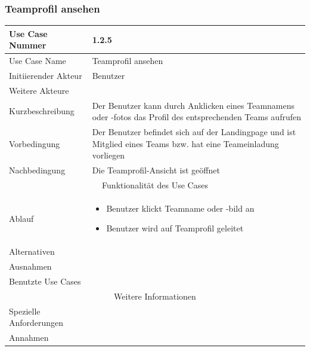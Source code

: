 \documentclass[10pt,a4paper]{article}
\begin{document}
		\subsubsection{Teamprofil ansehen}
		\begin{tabular}{|l|p{.5\linewidth}|}
			\hline Use Case Nummer & 1.2.5 \\ 
			\hline Use Case Name & Teamprofil ansehen \\ 
			\hline Initiierender Akteur & Benutzer \\
			\hline Weitere Akteure & \\
			\hline Kurzbeschreibung & Der Benutzer kann durch Anklicken eines Teamnamens oder -fotos das Profil des entsprechenden Teams aufrufen \\
			\hline Vorbedingung & Der Benutzer befindet sich auf der Landingpage und ist Mitglied eines Teams bzw. hat eine Teameinladung vorliegen \\
			\hline Nachbedingung & Die Teamprofil-Ansicht ist geöffnet \\
			\hline \multicolumn{2}{|c|}{Funktionalität des Use Cases}\\
			\hline Ablauf & \begin{itemize}
				\item Benutzer klickt Teamname oder -bild an
				\item Benutzer wird auf Teamprofil geleitet
			\end{itemize} \\
			\hline Alternativen & \\
			\hline Ausnahmen & \\
			\hline Benutzte Use Cases & \\
			\hline \multicolumn{2}{|c|}{Weitere Informationen} \\
			\hline Spezielle Anforderungen & \\
			\hline Annahmen & \\
			\hline
		\end{tabular}
				
\end{document}

